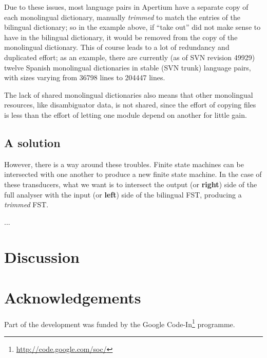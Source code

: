 \documentclass[11pt]{article}
\begin{document}
Due to these issues, most language pairs in Apertium have a separate
copy of each monolingual dictionary, manually \emph{trimmed} to match
the entries of the bilingual dictionary; so in the example above, if
``take out'' did not make sense to have in the bilingual dictionary,
it would be removed from the copy of the monolingual dictionary. This
of course leads to a lot of redundancy and duplicated effort; as an
example, there are currently (as of SVN revision 49929) twelve Spanish
monolingual dictionaries in stable (SVN trunk) language pairs, with
sizes varying from 36798 lines to 204447 lines.

The lack of shared monolingual dictionaries also means that other
monolingual resources, like disambiguator data, is not shared, since
the effort of copying files is less than the effort of letting one
module depend on another for little gain.

\subsection{A solution}

However, there is a way around these troubles. Finite state machines
can be intersected with one another to produce a new finite state
machine. In the case of these transducers, what we want is to
intersect the output (or \textbf{right}) side of the full analyser with the
input (or \textbf{left}) side of the bilingual FST, producing a
\emph{trimmed} FST.

...

\section{Discussion}
\section*{Acknowledgements}
Part of the development was funded by the Google
Code-In\footnote{\href{http://code.google.com/soc/}{http://code.google.com/soc/}
} programme.




\end{document}
